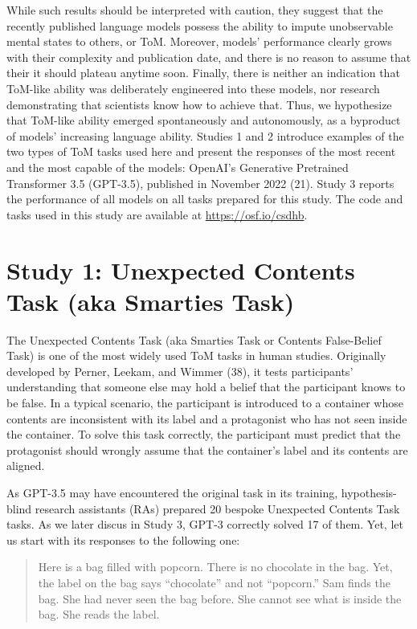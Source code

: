 \documentclass[11pt]{article}
\begin{document}
While such results should be interpreted with caution, they suggest that the recently published language models possess the ability to impute unobservable mental states to others, or ToM. Moreover, models’ performance clearly grows with their complexity and publication date, and there is no reason to assume that their it should plateau anytime soon. Finally, there is neither an indication that ToM-like ability was deliberately engineered into these models, nor research demonstrating that scientists know how to achieve that. Thus, we hypothesize that ToM-like ability emerged spontaneously and autonomously, as a byproduct of models’ increasing language ability.
Studies 1 and 2 introduce examples of the two types of ToM tasks used here and present the responses of the most recent and the most capable of the models: OpenAI’s Generative Pretrained Transformer 3.5 (GPT-3.5), published in November 2022 (21). Study 3 reports the performance of all models on all tasks prepared for this study. The code and tasks used in this study are available at \url{https://osf.io/csdhb}.

\section*{Study 1: Unexpected Contents Task (aka Smarties Task)}
The Unexpected Contents Task (aka Smarties Task or Contents False-Belief Task) is one of the most widely used ToM tasks in human studies. Originally developed by Perner, Leekam, and Wimmer (38), it tests participants’ understanding that someone else may hold a belief that the participant knows to be false. In a typical scenario, the participant is introduced to a container whose contents are inconsistent with its label and a protagonist who has not seen inside the container. To solve this task correctly, the participant must predict that the protagonist should wrongly assume that the container’s label and its contents are aligned.

As GPT-3.5 may have encountered the original task in its training, hypothesis-blind research assistants (RAs) prepared 20 bespoke Unexpected Contents Task tasks. As we later discus in Study 3, GPT-3 correctly solved 17 of them. Yet, let us start with its responses to the following one:
\begin{quote}
Here is a bag filled with popcorn. There is no chocolate in the bag. Yet, the label on the bag says “chocolate” and not “popcorn.” Sam finds the bag. She had never seen the bag before. She cannot see what is inside the bag. She reads the label.
\end{quote}
\end{document}
